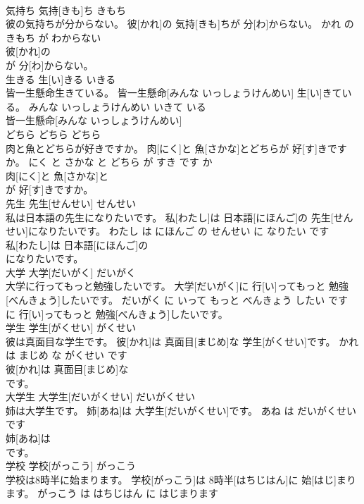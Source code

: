 \documentclass[8pt]{extreport}
\begin{document}
\begin{CJK}{UTF8}{min}
\\	気持ち	気持[きも]ち	きもち	
\\	彼の気持ちが分からない。	彼[かれ]の 気持[きも]ちが 分[わ]からない。	かれ の きもち が わからない	
\\	彼[かれ]の
\\	が 分[わ]からない。		
\\	生きる	生[い]きる	いきる	
\\	皆一生懸命生きている。	皆一生懸命[みんな いっしょうけんめい] 生[い]きている。	みんな いっしょうけんめい いきて いる	
\\	皆一生懸命[みんな いっしょうけんめい]
\\	どちら	どちら	どちら	
\\	肉と魚とどちらが好きですか。	肉[にく]と 魚[さかな]とどちらが 好[す]きですか。	にく と さかな と どちら が すき です か	
\\	肉[にく]と 魚[さかな]と
\\	が 好[す]きですか。		
\\	先生	先生[せんせい]	せんせい	
\\	私は日本語の先生になりたいです。	私[わたし]は 日本語[にほんご]の 先生[せんせい]になりたいです。	わたし は にほんご の せんせい に なりたい です	
\\	私[わたし]は 日本語[にほんご]の
\\	になりたいです。		
\\	大学	大学[だいがく]	だいがく	
\\	大学に行ってもっと勉強したいです。	大学[だいがく]に 行[い]ってもっと 勉強[べんきょう]したいです。	だいがく に いって もっと べんきょう したい です	
\\	に 行[い]ってもっと 勉強[べんきょう]したいです。		
\\	学生	学生[がくせい]	がくせい	
\\	彼は真面目な学生です。	彼[かれ]は 真面目[まじめ]な 学生[がくせい]です。	かれ は まじめ な がくせい です	
\\	彼[かれ]は 真面目[まじめ]な
\\	です。		
\\	大学生	大学生[だいがくせい]	だいがくせい	
\\	姉は大学生です。	姉[あね]は 大学生[だいがくせい]です。	あね は だいがくせい です	
\\	姉[あね]は
\\	です。		
\\	学校	学校[がっこう]	がっこう	
\\	学校は8時半に始まります。	学校[がっこう]は 8時半[はちじはん]に 始[はじ]まります。	がっこう は はちじはん に はじまります	

\end{CJK}
\end{document}
